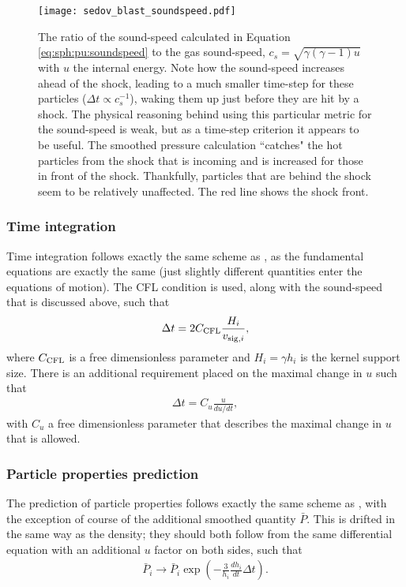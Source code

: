 \begin{figure}
  \centering
  \texttt{[image: sedov\_blast\_soundspeed.pdf]}
  \caption{The ratio of the sound-speed calculated in Equation
    \ref{eq:sph:pu:soundspeed} to the gas sound-speed,
    $c_s = \sqrt{\gamma(\gamma - 1) u}$ with $u$ the internal energy. Note how
    the sound-speed increases ahead of the shock, leading to a much smaller
    time-step for these particles ($\Delta t \propto c_s^{-1}$), waking them up
    just before they are hit by a shock. The physical reasoning behind using
    this particular metric for the sound-speed is weak, but as a time-step
    criterion it appears to be useful. The smoothed pressure calculation
    ``catches" the hot particles from the shock that is incoming and is
    increased for those in front of the shock. Thankfully, particles that are
    behind the shock seem to be relatively unaffected. The red line shows the
    shock front.}
  \label{fig:sph:soundspeed}  
\end{figure}


\subsubsection{Time integration}

Time integration follows exactly the same scheme as \MinimalSPH, as the
fundamental equations are exactly the same (just slightly different quantities
enter the equations of motion). The CFL condition is used, along with the
sound-speed that is discussed above, such that
\begin{align}
  \Delta t = 2 C_{\rm CFL} \frac{H_i}{v_{{\rm sig},i}},
  \label{eq:sph:pu:dt}
\end{align}
where $C_{\rm CFL}$ is a free dimensionless parameter and $H_i = \gamma h_i$ is
the kernel support size. There is an additional requirement placed on the
maximal change in $u$ such that
\begin{align}
  \Delta t = C_{u} \frac{u}{du/dt},
  \label{eq:sph:pu:dt_du}
\end{align}
with $C_{u}$ a free dimensionless parameter that describes the maximal change
in $u$ that is allowed.

\subsubsection{Particle properties prediction}

The prediction of particle properties follows exactly the same scheme as
\MinimalSPH, with the exception of course of the additional smoothed quantity
$\bar{P}$. This is drifted in the same way as the density; they should both
follow from the same differential equation with an additional $u$ factor on
both sides, such that
\begin{align}
  \bar{P}_i \rightarrow \bar{P}_i
  \exp\left(-\frac{3}{h_i}\frac{dh_i}{dt} \Delta t\right). 
  \label{eq:sph:pu:drift}
\end{align}

